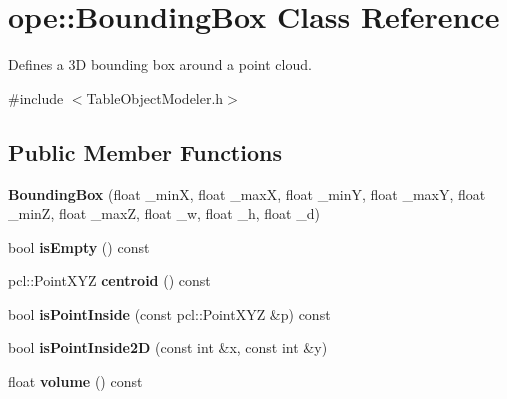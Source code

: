 \hypertarget{classope_1_1_bounding_box}{\section{ope\-:\-:Bounding\-Box Class Reference}
\label{classope_1_1_bounding_box}
}


Defines a 3\-D bounding box around a point cloud.  




{\ttfamily \#include $<$Table\-Object\-Modeler.\-h$>$}

\subsection*{Public Member Functions}
\begin{DoxyCompactItemize}
\item 
\hypertarget{classope_1_1_bounding_box_a6bf3cd1ea890ce82a3b0c3cd0ded0011}{{\bfseries Bounding\-Box} (float \-\_\-min\-X, float \-\_\-max\-X, float \-\_\-min\-Y, float \-\_\-max\-Y, float \-\_\-min\-Z, float \-\_\-max\-Z, float \-\_\-w, float \-\_\-h, float \-\_\-d)}\label{classope_1_1_bounding_box_a6bf3cd1ea890ce82a3b0c3cd0ded0011}

\item 
\hypertarget{classope_1_1_bounding_box_a3be3ab4152d3a74617b681639caf1533}{bool {\bfseries is\-Empty} () const }\label{classope_1_1_bounding_box_a3be3ab4152d3a74617b681639caf1533}

\item 
\hypertarget{classope_1_1_bounding_box_ae59647aa648e2c25fdca282e21eed6ee}{pcl\-::\-Point\-X\-Y\-Z {\bfseries centroid} () const }\label{classope_1_1_bounding_box_ae59647aa648e2c25fdca282e21eed6ee}

\item 
\hypertarget{classope_1_1_bounding_box_a340f9d4d01df6231dca2e0b89318f5da}{bool {\bfseries is\-Point\-Inside} (const pcl\-::\-Point\-X\-Y\-Z \&p) const }\label{classope_1_1_bounding_box_a340f9d4d01df6231dca2e0b89318f5da}

\item 
\hypertarget{classope_1_1_bounding_box_aacda9c1987dd5003393119449d805da1}{bool {\bfseries is\-Point\-Inside2\-D} (const int \&x, const int \&y)}\label{classope_1_1_bounding_box_aacda9c1987dd5003393119449d805da1}

\item 
\hypertarget{classope_1_1_bounding_box_abb898c6e0512417124625bb34f6228bd}{float {\bfseries volume} () const }\label{classope_1_1_bounding_box_abb898c6e0512417124625bb34f6228bd}


\end{DoxyCompactItemize}
